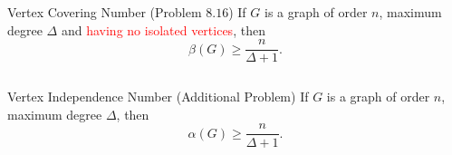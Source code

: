 \begin{frame}{}
  \begin{exampleblock}{Vertex Covering Number (Problem $8.16$)}
    If $G$ is a graph of order $n$, maximum degree $\Delta$ 
    and \textcolor<2->{red}{having no isolated vertices}, then 
    \[
      \beta(G) \ge \frac{n}{\Delta + 1}.
    \]
  \end{exampleblock}

  \begin{columns}
      \vspace{-0.20cm}
      \vspace{-0.30cm}
  \end{columns}
\end{frame}

\begin{frame}{}
  \begin{exampleblock}{Vertex Independence Number (Additional Problem)}
    If $G$ is a graph of order $n$, maximum degree $\Delta$, then
    \[
      \alpha(G) \ge \frac{n}{\Delta + 1}.
    \]
  \end{exampleblock}

  \pause
  \begin{center}
     \\[6pt] \pause
  \end{center}

  \pause
  \begin{columns}
      
  \end{columns}
\end{frame}
